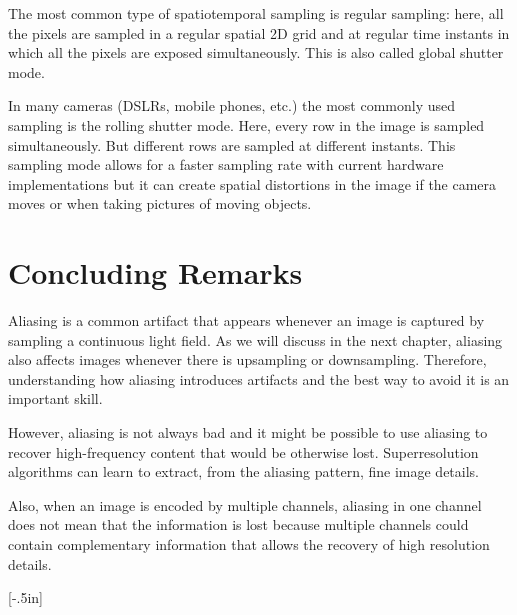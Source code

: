 
The most common type of spatiotemporal sampling is regular sampling: here, all the pixels are sampled in a regular spatial 2D grid and at regular time instants in which all the pixels are exposed simultaneously. This is also called global shutter mode. 

In many cameras (DSLRs, mobile phones, etc.) the most commonly used sampling is the rolling shutter mode. Here, every row in the image is sampled simultaneously. But different rows are sampled at different instants. This sampling mode allows for a faster sampling rate with current hardware implementations but it can create spatial distortions in the image if the camera moves or when taking pictures of moving objects. 

%
%
%
%




\section{Concluding Remarks}

Aliasing is a common artifact that appears whenever an image is captured by sampling a continuous light field. As we will discuss in the next chapter, aliasing also affects images whenever there is upsampling or downsampling. Therefore, understanding how aliasing introduces artifacts and the best way to avoid it is an important skill. 

However, aliasing is not always bad and it might be possible to use aliasing to recover high-frequency content that would be otherwise lost. Superresolution algorithms can learn to extract, from the aliasing pattern, fine image details.

Also, when an image is encoded by multiple channels, aliasing in one channel does not mean that the information is lost because multiple channels could contain complementary information that allows the recovery of high resolution details.

[-.5in]
